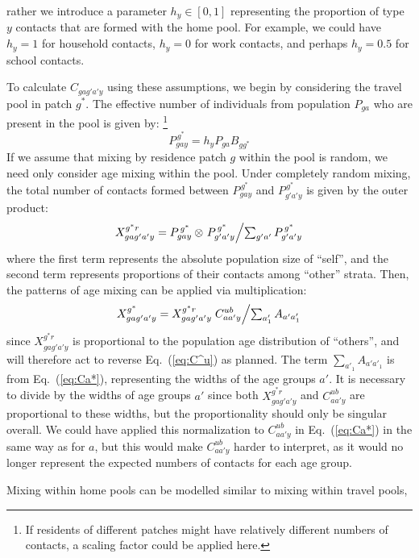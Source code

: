 rather we introduce a parameter $h_y \in [0,1]$ representing
the proportion of type $y$ contacts that are formed with the home pool.
For example, we could have
$h_y = 1$ for household contacts, $h_y = 0$ for work contacts, and perhaps $h_y = 0.5$ for school contacts.
\par
To calculate $C_{gag'a'y}$ using these assumptions, we begin by considering the travel pool in patch $g^*$.
The effective number of individuals from population $P_{ga}$
who are present in the pool is given by:%
\footnote{If residents of different patches might have relatively different numbers of contacts,
  a scaling factor could be applied here.}
\begin{equation}\label{eq:P*}
  P^{\,g^*}_{gay} = h_y P_{ga} B_{gg^*}
\end{equation}
If we assume that mixing by residence patch $g$ within the pool is random,
we need only consider age mixing within the pool.
Under completely random mixing,
the total number of contacts formed between $P^{\,g^*}_{gay}$ and $P^{\,g^*}_{g'a'y}$
is given by the outer product:
\begin{equation}\label{eq:X*r.gagay}
  X^{g^*r}_{gag'a'y} = P^{\,g^*}_{gay} \otimes \left. P^{\,g^*}_{g'a'y} \middle/ \textstyle\sum_{g'a'} P^{\,g^*}_{g'a'y}\right.
\end{equation}
where the first term represents the absolute population size of ``self'',
and the second term represents proportions of their contacts among ``other'' strata.
Then, the patterns of age mixing can be applied via multiplication:
\begin{equation}\label{eq:X*.gagay}
  X^{g^*}_{gag'a'y} = X^{g^*r}_{gag'a'y} \left.C^{ub}_{aa'y} \middle/ \textstyle\sum_{a'_1} A_{a'a'_1}\right.
\end{equation}
since $X^{g^*r}_{gag'a'y}$ is proportional to the population age distribution of ``others'',
and will therefore act to reverse Eq.~(\ref{eq:C^u}) as planned.
The term $\sum_{a'_1} A_{a'a'_1}$ is from Eq.~(\ref{eq:Ca*}),
representing the widths of the age groups $a'$.
It is necessary to divide by the widths of age groups $a'$ since
both $X^{g^*r}_{gag'a'y}$ and $C^{ub}_{aa'y}$ are proportional to these widths,
but the proportionality should only be singular overall.
We could have applied this normalization to $C^{ub}_{aa'y}$
in Eq.~(\ref{eq:Ca*}) in the same way as for $a$,
but this would make $C^{ub}_{aa'y}$ harder to interpret,
as it would no longer represent the expected numbers of contacts for each age group.
\par
Mixing within home pools can be modelled similar to mixing within travel pools,
